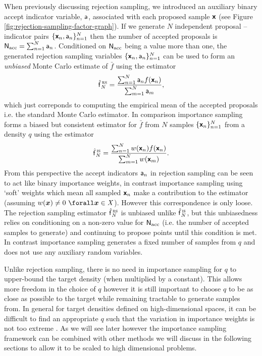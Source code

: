 When previously discussing rejection sampling, we introduced an auxiliary binary accept indicator variable, $\mathsf{a}$, associated with each proposed sample $\boldsymbol{\mathsf{x}}$ (see Figure \ref{fig:rejection-sampling-factor-graph}). If we generate $N$ independent proposal -- indicator pairs $\lbrace \boldsymbol{\mathsf{x}}_n, \mathsf{a}_n \rbrace_{n=1}^N$ then the number of accepted proposals is $\mathsf{N}_{\textrm{acc}} = \sum_{n=1}^N \mathsf{a}_n$. Conditioned on $\mathsf{N}_{\textrm{acc}}$ being a value more than one, the generated rejection sampling variables $\lbrace \boldsymbol{\mathsf{x}}_n, \mathsf{a}_n \rbrace_{n=1}^N$ can be used to form an \emph{unbiased} Monte Carlo estimate of $\bar{f}$ using the estimator
\begin{equation}\label{eq:rejection-sampler-mc-estimator}
  \hatf_N^{\,\textsc{rs}} = \frac{\sum_{n=1}^N\rvar{a}_n f\lpa\rvct{x}_n\rpa}{\sum_{m=1}^N \rvar{a}_m},
\end{equation}
which just correponds to computing the empirical mean of the accepted proposals i.e. the standard Monte Carlo estimator. In comparison importance sampling forms a biased but consistent estimator for $\bar{f}$ from $N$ samples $\lbrace \boldsymbol{\mathsf{x}}_n \rbrace_{n=1}^N$ from a density $q$ using the estimator
\begin{equation}\label{eq:rejection-sampler-mc-estimator}
  \hatf_N^{\,\textsc{is}} = \frac{\sum_{n=1}^N w\lpa\rvct{x}_n\rpa f\lpa\rvct{x}_n\rpa}{\sum_{m=1}^N w\lpa\rvct{x}_m\rpa}.
\end{equation}
From this perspective the accept indicators $\mathsf{a}_n$ in rejection sampling can be seen to act like binary importance weights, in contrast importance sampling using `soft' weights which mean all sampled $\boldsymbol{\mathsf{x}}_n$ make a contribution to the estimator (assuming $w(\vct{x}) \neq 0 ~\forall \vct{x} \in \set{X}$). However this correspondence is only loose. The rejection sampling estimator $\hatf_N^{\,\textsc{rs}}$ is unbiased unlike $\hatf_N^{\,\textsc{is}}$, but this unbiasedness relies on conditioning on a non-zero value for $\mathsf{N}_{\textrm{acc}}$ (i.e. the number of accepted samples to generate) and continuing to propose points until this condition is met. In contrast importance sampling generates a fixed number of samples from $q$ and does not use any auxiliary random variables.

Unlike rejection sampling, there is no need in importance sampling for $q$ to upper-bound the target density (when multiplied by a constant). This allows more freedom in the choice of $q$ however it is still important to choose $q$ to be as close as possible to the target while remaining tractable to generate samples from. In general for target densities defined on high-dimensional spaces, it can be difficult to find an appropriate $q$ such that the variation in importance weights is not too extreme \citep{mackay2003information}. As we will see later however the importance sampling framework can be combined with other methods we will discuss in the following sections to allow it to be scaled to high dimensional problems.

